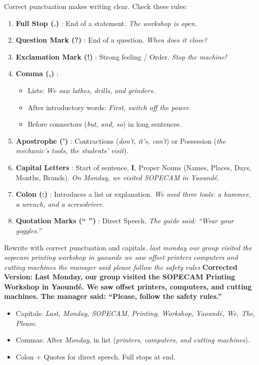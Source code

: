 \documentclass[11pt]{article}
\begin{document}
\begin{methode}
Correct punctuation makes writing clear. Check these rules:
\begin{enumerate}
\item \textbf{Full Stop (.)} : End of a statement. \emph{The workshop is open.}
\item \textbf{Question Mark (?)} : End of a question. \emph{When does it close?}
\item \textbf{Exclamation Mark (!)} : Strong feeling / Order. \emph{Stop the machine!}
\item \textbf{Comma (,)} :
\begin{itemize}
\item Lists: \emph{We saw lathes, drills, and grinders.}
\item After introductory words: \emph{First, switch off the power.}
\item Before connectors (\emph{but, and, so}) in long sentences.
\end{itemize}
\item \textbf{Apostrophe (')} : Contractions (\emph{don't, it's, can't}) or Possession (\emph{the mechanic's tools, the students' visit}).
\item \textbf{Capital Letters} : Start of sentence, \textbf{I}, Proper Nouns (Names, Places, Days, Months, Brands). \emph{On Monday, we visited SOPECAM in Yaoundé.}
\item \textbf{Colon (:)} : Introduces a list or explanation. \emph{We need three tools: a hammer, a wrench, and a screwdriver.}
\item \textbf{Quotation Marks (`` '')} : Direct Speech. \emph{The guide said: ``Wear your goggles.''}
\end{enumerate}
\end{methode}

\begin{exoresolu}
Rewrite with correct punctuation and capitals.
\emph{last monday our group visited the sopecam printing workshop in yaounde we saw offset printers computers and cutting machines the manager said please follow the safety rules}
\tcblower
\textbf{Corrected Version:}
\textbf{Last Monday, our group visited the SOPECAM Printing Workshop in Yaoundé. We saw offset printers, computers, and cutting machines. The manager said: ``Please, follow the safety rules.''}
\begin{itemize}
\item Capitals: \emph{Last, Monday, SOPECAM, Printing, Workshop, Yaoundé, We, The, Please}.
\item Commas: After \emph{Monday}, in list (\emph{printers, computers, and cutting machines}).
\item Colon + Quotes for direct speech. Full stops at end.
\end{itemize}
\end{exoresolu}
\end{document}

